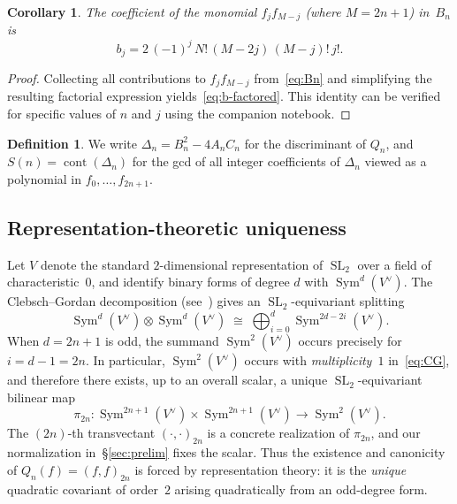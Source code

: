 \documentclass[10pt]{amsart}
\newtheorem{corollary}[theorem]{Corollary}
\theoremstyle{definition}
\newtheorem{definition}[theorem]{Definition}
\theoremstyle{remark}
\DeclareMathOperator{\cont}{cont}
\DeclareMathOperator{\SL}{SL}
\DeclareMathOperator{\Sym}{Sym}
\begin{document}
\begin{corollary}\label{cor:b-factored}
The coefficient of the monomial $f_jf_{M-j}$ (where $M=2n{+}1$) in~$B_n$ is
\begin{equation}\label{eq:b-factored}
b_j = 2\,(-1)^j\,N!\,(M{-}2j)\,(M{-}j)!\,j!.
\end{equation}
\end{corollary}
\begin{proof}
Collecting all contributions to $f_jf_{M-j}$ from~\eqref{eq:Bn}
and simplifying the resulting factorial expression yields~\eqref{eq:b-factored}.
This identity can be verified for specific values of $n$ and $j$ using
the companion notebook.
\end{proof}

\begin{definition}\label{def:content}
We write $\Delta_n = B_n^2 - 4A_nC_n$ for the discriminant of $Q_n$, and
$S(n)=\cont(\Delta_n)$ for the gcd of all integer coefficients of $\Delta_n$
viewed as a polynomial in $f_0,\dots,f_{2n+1}$.
\end{definition}

\subsection{Representation-theoretic uniqueness}\label{subsec:rep-theory}

Let $V$ denote the standard $2$-dimensional representation of $\SL_2$ over a
field of characteristic~$0$, and identify binary forms of degree $d$ with
$\Sym^d(V^\vee)$.  The Clebsch--Gordan decomposition
(see~\cite[Lecture~11]{FultonHarris1991}) gives an $\SL_2$-equivariant splitting
\begin{equation}\label{eq:CG}
\Sym^d(V^\vee) \otimes \Sym^d(V^\vee)
\;\cong\;
\bigoplus_{i=0}^{d} \Sym^{2d-2i}(V^\vee).
\end{equation}
When $d = 2n+1$ is odd, the summand $\Sym^2(V^\vee)$ occurs precisely for
$i = d-1 = 2n$.  In particular, $\Sym^2(V^\vee)$ occurs with
\emph{multiplicity~$1$} in~\eqref{eq:CG}, and therefore there exists, up to
an overall scalar, a unique $\SL_2$-equivariant bilinear map
\[
\pi_{2n}: \Sym^{2n+1}(V^\vee) \times \Sym^{2n+1}(V^\vee) \longrightarrow
\Sym^2(V^\vee).
\]
The $(2n)$-th transvectant $(\cdot,\cdot)_{2n}$ is a concrete realization of
$\pi_{2n}$, and our normalization in~\S\ref{sec:prelim} fixes the scalar.
Thus the existence and canonicity of $Q_n(f) = (f,f)_{2n}$ is forced by
representation theory: it is the \emph{unique} quadratic covariant of
order~$2$ arising quadratically from an odd-degree form.
\end{document}
